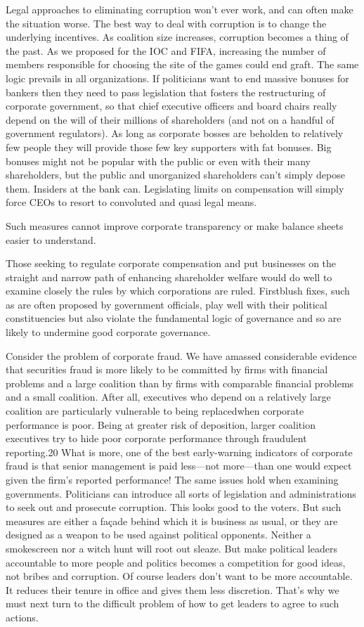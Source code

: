 \documentclass[10pt]{article}
\begin{document}
{\large Legal approaches to eliminating corruption won't ever work, and can
often make the situation worse. The best way to deal with corruption is to change
the underlying incentives. As coalition size increases, corruption becomes a
thing of the past. As we proposed for the IOC and FIFA, increasing the number of
members responsible for choosing the site of the games could end graft. The same
logic prevails in all organizations. If politicians want to end massive bonuses
for bankers then they need to pass legislation that fosters the restructuring of
corporate government, so that chief executive officers and board chairs really
depend on the will of their millions of shareholders (and not on a handful of
government regulators). As long as corporate bosses are beholden to relatively
few people they will provide those few key supporters with fat bonuses. Big
bonuses might not be popular with the public or even with their many
shareholders, but the public and unorganized shareholders can't simply depose
them. Insiders at the bank can. Legislating limits on compensation will simply
force CEOs to resort to convoluted and quasi legal means.}

{\large Such measures cannot improve corporate transparency or make balance
sheets easier to understand.}

{\large Those seeking to regulate corporate compensation and put businesses on
the straight and narrow path of enhancing shareholder welfare would do well to
examine closely the rules by which corporations are ruled. Firstblush fixes, such
as are often proposed by government officials, play well with their political
constituencies but also violate the fundamental logic of governance and so are
likely to undermine good corporate governance.}

{\large Consider the problem of corporate fraud. We have amassed considerable
evidence that securities fraud is more likely to be committed by firms with
financial problems and a large coalition than by firms with comparable financial
problems and a small coalition. After all, executives who depend on a relatively
large coalition are particularly vulnerable to being replacedwhen corporate
performance is poor. Being at greater risk of deposition, larger coalition
executives try to hide poor corporate performance through fraudulent reporting.20
What is more, one of the best early-warning indicators of corporate fraud is that
senior management is paid less---not more---than one would expect given the
firm's reported performance! The same issues hold when examining governments.
Politicians can introduce all sorts of legislation and administrations to seek
out and prosecute corruption. This looks good to the voters. But such measures
are either a fa\c{c}ade behind which it is business as usual, or they are
designed as a weapon to be used against political opponents. Neither a
smokescreen nor a witch hunt will root out sleaze. But make political leaders
accountable to more people and politics becomes a competition for good ideas, not
bribes and corruption. Of course leaders don't want to be more accountable. It
reduces their tenure in office and gives them less discretion. That's why we must
next turn to the difficult problem of how to get leaders to agree to such
actions.}
\pagebreak{}
\end{document}
